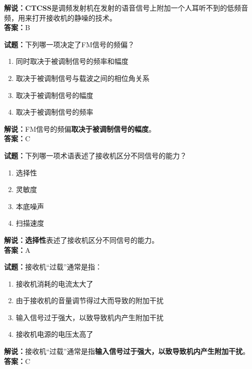 \documentclass{ctexbook}
\begin{document}
\noindent\textbf{解说：}\textbf{CTCSS}是调频发射机在发射的语音信号上附加一个人耳听不到的低频音频，用来打开接收机的静噪的技术。\\\noindent\textbf{答案：}B%


\bigskip


\noindent\textbf{试题：}下列哪一项决定了FM信号的频偏？

\begin{enumerate}[leftmargin=3em]
	\item 同时取决于被调制信号的频率和幅度
	\item 取决于被调制信号与载波之间的相位角关系
	\item 取决于被调制信号的幅度
	\item 取决于被调制信号的频率
\end{enumerate}

\noindent\textbf{解说：}FM信号的频偏\textbf{取决于被调制信号的幅度}。\\\noindent\textbf{答案：}C%


\bigskip


\noindent\textbf{试题：}下列哪一项术语表述了接收机区分不同信号的能力？

\begin{enumerate}[leftmargin=3em]
	\item 选择性
	\item 灵敏度
	\item 本底噪声
	\item 扫描速度
\end{enumerate}

\noindent\textbf{解说：}\textbf{选择性}表述了接收机区分不同信号的能力。\\\noindent\textbf{答案：}A%


\bigskip


\noindent\textbf{试题：}接收机“过载”通常是指：

\begin{enumerate}[leftmargin=3em]
	\item 接收机消耗的电流太大了
	\item 由于接收机的音量调节得过大而导致的附加干扰
	\item 输入信号过于强大，以致导致机内产生附加干扰
	\item 接收机电源的电压太高了
\end{enumerate}

\noindent\textbf{解说：}接收机“过载”通常是指\textbf{输入信号过于强大，以致导致机内产生附加干扰}。\\\noindent\textbf{答案：}C%
\end{document}
